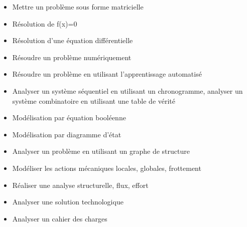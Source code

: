 \begin{itemize}
\item  \footnotesize {} \normalsize \hspace{.2cm}Mettre un problème sous forme matricielle\hfill {}
\item  \footnotesize {} \normalsize \hspace{.2cm}Résolution de f(x)=0\hfill {}
\item  \footnotesize {} \normalsize \hspace{.2cm}Résolution d'une équation différentielle\hfill {}
\item  \footnotesize {} \normalsize \hspace{.2cm}Résoudre un problème numériquement\hfill {}
\item  \footnotesize {} \normalsize \hspace{.2cm}Résoudre un problème en utilisant l'apprentissage automatisé\hfill {}
\item  \footnotesize {} \normalsize \hspace{.2cm}Analyser un système séquentiel en utilisant un chronogramme, analyser un système combinatoire en utilisant une table de vérité\hfill {}
\item  \footnotesize {} \normalsize \hspace{.2cm}Modélisation par équation booléenne\hfill {}
\item  \footnotesize {} \normalsize \hspace{.2cm}Modélisation par diagramme d'état\hfill {}
\item  \footnotesize {} \normalsize \hspace{.2cm}Analyser un problème en utilisant un graphe de structure\hfill {}
\item  \footnotesize {} \normalsize \hspace{.2cm}Modéliser les actions mécaniques locales, globales, frottement\hfill {}
\item  \footnotesize {} \normalsize \hspace{.2cm}Réaliser une analyse structurelle, flux, effort\hfill {}
\item  \footnotesize {} \normalsize \hspace{.2cm}Analyser une solution technologique\hfill {}
\item  \footnotesize {} \normalsize \hspace{.2cm}Analyser un cahier des charges\hfill {}

\end{itemize}

